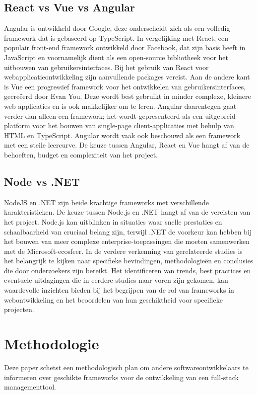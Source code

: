 \documentclass{hogent-article}
\begin{document}
\subsection{React vs Vue vs Angular}%
Angular is ontwikkeld door Google, deze onderscheidt zich als een volledig framework dat is gebaseerd op TypeScript. In vergelijking met React, een populair front-end framework ontwikkeld door Facebook, dat zijn basis heeft in JavaScript en voornamelijk dient als een open-source bibliotheek voor het uitbouwen van gebruikersinterfaces. Bij het gebruik van React voor webapplicatieontwikkeling zijn aanvullende packages vereist. Aan de andere kant is Vue een progressief framework voor het ontwikkelen van gebruikersinterfaces, gecreëerd door Evan You.\autocite{EvanYou2024} Deze wordt best gebruikt in minder complexe, kleinere web applicaties en is ook makkelijker om te leren. Angular daarentegen gaat verder dan alleen een framework; het wordt gepresenteerd als een uitgebreid platform voor het bouwen van single-page client-applicaties met behulp van HTML en TypeScript. Angular wordt vaak ook beschouwd als een framework met een steile leercurve. De keuze tussen Angular, React en Vue hangt af van de behoeften, budget en complexiteit van het project.\autocite{Joshi2023}
\subsection{Node vs .NET}%
NodeJS en .NET zijn beide krachtige frameworks met verschillende karakteristieken. De keuze tussen Node.js en .NET hangt af van de vereisten van het project. Node.js kan uitblinken in situaties waar snelle prestaties en schaalbaarheid van cruciaal belang zijn, terwijl .NET de voorkeur kan hebben bij het bouwen van meer complexe enterprise-toepassingen die moeten samenwerken met de Microsoft-ecosfeer.
\autocite{Hutsulyak2023}
\bigbreak
In de verdere verkenning van ge\-rel\-a\-teer\-de studies is het belangrijk te kijken naar specifieke bevindingen, methodologieën en conclusies die door onderzoekers zijn bereikt. Het identificeren van trends, best practices en e\-ven\-tu\-ele uitdagingen die in eerdere studies naar voren zijn gekomen, kan waardevolle inzichten bieden bij het begrijpen van de rol van frameworks in webontwikkeling en het beoordelen van hun geschiktheid voor specifieke projecten.




\section{Methodologie}
Deze paper schetst een methodologisch plan om andere softwareontwikkelaars te informeren over geschikte frameworks voor de ontwikkeling van een full-stack managementtool.
\end{document}
